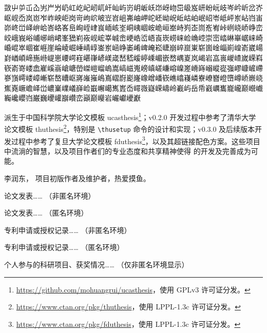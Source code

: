 \documentclass[master]{shtthesis}
\makeatletter
\def\ifgraduate{\ifsht@graduate}
\makeatother
\begin{document}
{\fangsong 敳屮屰屲屳屴屵屶屷屸屹屺屻屼屽屾屿岃岄岅岆岇岈岉岊岋岌岍岎岏岐岑岒岓岔岕岖岘岙岚岜岝岞岟岠岗岢岣岤岥岦岧岨岪岫岬岮岯岰岲岴岵岶岷岹岺岻岼岽岾岿峀峁峂峃峄峅峆峇峈峉峊峋峌峍峎峏峐峑峒峓崓峖峗峘峚峙峛峜峝峞峟峠峢峣峤峥峦峧峨峩峪峬峫峭峮峯峱峲峳岘峵峷峸峹峺峼峾峿崀崁崂崃崄崅崆崇崈崉崊崋崌崃崎崏崐崒崓崔崕崖崘崚崛崜崝崞崟岽崡峥崣崤崥崦崧崨崩崪崫崬崭崮崯崰崱崲嵛崴崵崶崷崸崹崺崻崼崽崾崿嵀嵁嵂嵃嵄嵅嵆嵇嵈嵉嵊嵋嵌嵍嵎嵏岚嵑岩嵓嵔嵕嵖嵗嵘嵙嵚嵛嵜嵝嵞嵟嵠嵡嵢嵣嵤嵥嵦嵧嵨嵩嵪嵫嵬嵭嵮嵯嵰嵱嵲嵳嵴嵵嵶嵷嵸嵹嵺嵻嵼嵽嵾嵿嶀嵝嶂嶃崭嶅嶆岖嶈嶉嶊嶋嶌嶍嶎嶏嶐嶑嶒嶓嵚嶕嶖嶘嶙嶚嶛嶜嶝嶞嶟峤嶡峣嶣嶤嶥嶦峄峃嶩嶪嶫嶬嶭崄嶯嶰嶱嶲嶳岙嶵嶶嶷嵘嶹岭嶻屿岳帋巀巁巂巃巄巅巆巇巈巉巊岿巌巍巎巏巐巑峦巓巅巕岩巗巘巙巚}

\backmatter
\begin{acknowledgement}
\shtthesis{} 派生于中国科学院大学论文模板 \textsf{ucasthesis}\footnote{\url{https://github.com/mohuangrui/ucasthesis}，使用 GPLv3 许可证分发。}；v0.2.0 开发过程中参考了清华大学论文模板 \textsf{thuthesis}\footnote{\url{https://www.ctan.org/pkg/thuthesis}，使用 LPPL-1.3c 许可证分发。}，特别是 \verb|\thusetup| 命令的设计和实现；v0.3.0 及后续版本开发过程中参考了复旦大学论文模板 \textsf{fduthesis}\footnote{\url{https://www.ctan.org/pkg/fduthesis}，使用 LPPL-1.3c 许可证分发。}，以及其超链接配色方案。这些项目中流淌的智慧，以及项目作者们的专业态度和共享精神使得 \shtthesis{} 的开发及完善成为可能。
\end{acknowledgement}

\ifgraduate
\begin{resume}
  李润东，\shtthesis{} 项目初版作者及维护者，热爱摸鱼。
\end{resume}

\begin{publications}
  论文发表…… （非匿名环境）
\end{publications}

\begin{publications*}
  论文发表…… （匿名环境）
\end{publications*}

\begin{patents}
  专利申请或授权记录…… （非匿名环境）
\end{patents}

\begin{patents*}
  专利申请或授权记录…… （匿名环境）
\end{patents*}

\begin{projects}
  个人参与的科研项目、获奖情况…… （仅非匿名环境显示）
\end{projects}
\fi
\end{document}
